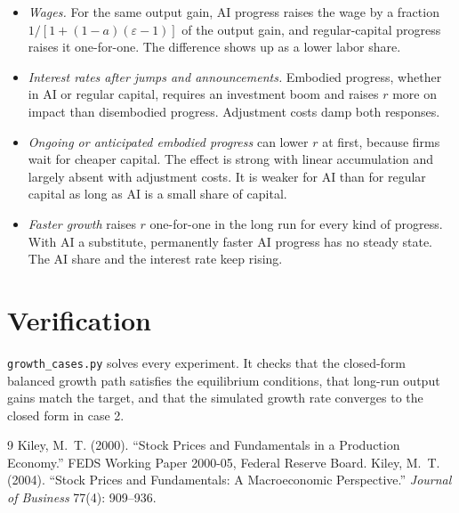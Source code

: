 \documentclass[11pt]{article}
\newcommand{\e}{\varepsilon}
\begin{document}
\begin{itemize}
\item \emph{Wages.} For the same output gain, AI progress raises the wage by a fraction
$1/[1+(1-a)(\e-1)]$ of the output gain, and regular-capital progress raises it
one-for-one. The difference shows up as a lower labor share.
\item \emph{Interest rates after jumps and announcements.} Embodied progress, whether in
AI or regular capital, requires an investment boom and raises $r$ more on impact than
disembodied progress. Adjustment costs damp both responses.
\item \emph{Ongoing or anticipated embodied progress} can lower $r$ at first, because firms
wait for cheaper capital. The effect is strong with linear accumulation and largely
absent with adjustment costs. It is weaker for AI than for regular capital as long as
AI is a small share of capital.
\item \emph{Faster growth} raises $r$ one-for-one in the long run for every kind of
progress. With AI a substitute, permanently faster AI progress has no steady state.
The AI share and the interest rate keep rising.
\end{itemize}

\appendix
\section{Verification}
\texttt{growth\_cases.py} solves every experiment. It checks that the closed-form
balanced growth path satisfies the equilibrium conditions, that long-run output gains
match the target, and that the simulated growth rate converges to the closed form
in case 2.

\begin{table}[h]\centering\tiny

\end{table}

\begin{thebibliography}{9}
Kiley, M.~T. (2000). ``Stock Prices and Fundamentals in a Production Economy.''
FEDS Working Paper 2000-05, Federal Reserve Board.
Kiley, M.~T. (2004). ``Stock Prices and Fundamentals: A Macroeconomic Perspective.''
\emph{Journal of Business} 77(4): 909--936.
\end{thebibliography}
\end{document}
